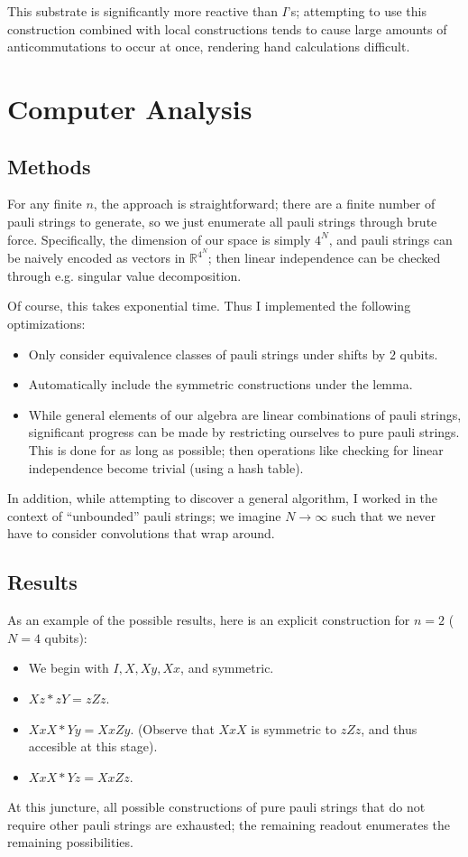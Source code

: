 \documentclass[fleqn,12pt]{article}
\newcommand{\RR}{\mathbb{R}}
\begin{document}
This substrate is significantly more reactive than $I$'s;
attempting to use this construction combined with local constructions
tends to cause large amounts of anticommutations to occur at once,
rendering hand calculations difficult.

\section{Computer Analysis}

\subsection{Methods}

For any finite $n$, the approach is straightforward; there are a finite
number of pauli strings to generate, so we just enumerate all pauli
strings through brute force. Specifically, the dimension of our space is
simply $4^N$, and pauli strings can be naively encoded as vectors in $\RR^{4^N}$;
then linear independence can be checked through e.g. singular value decomposition.

Of course, this takes exponential time. Thus I implemented the following optimizations:
\begin{itemize}
    \item Only consider equivalence classes of pauli strings under shifts by $2$ qubits.
    \item Automatically include the symmetric constructions under the lemma.
    \item While general elements of our algebra are linear combinations of pauli
          strings, significant progress can be made by restricting ourselves to pure
          pauli strings. This is done for as long as possible;
          then operations like checking for linear independence become trivial
          (using a hash table).
\end{itemize}

In addition, while attempting to discover a general algorithm, I worked
in the context of ``unbounded'' pauli strings; we imagine $N\to \infty$
such that we never have to consider convolutions that wrap around.

\subsection{Results}

As an example of the possible results, here is an explicit construction for $n = 2$
($N = 4$ qubits):
\begin{itemize}
    \item We begin with $I, X, Xy, Xx$, and symmetric.
    \item $Xz * zY = zZz$.
    \item $XxX * Yy = XxZy$. (Observe that $XxX$ is symmetric to $zZz$, and thus accesible at this stage).
    \item $XxX * Yz = XxZz$.
\end{itemize}
At this juncture, all possible constructions of pure pauli strings
that do not require other pauli strings are exhausted; the remaining readout
enumerates the remaining possibilities.
\end{document}
